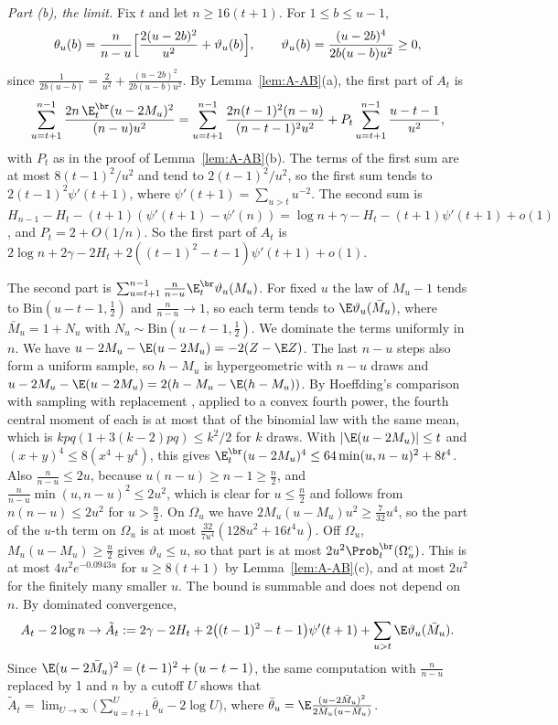 \emph{Part (b), the limit.} Fix $t$ and let $n\ge16(t+1)$. For
$1\le b\le u-1$,
\[
 \theta_u(b)=\frac n{n-u}\Bigl[\frac{2(u-2b)^2}{u^2}+\vartheta_u(b)\Bigr],
 \qquad \vartheta_u(b)=\frac{(u-2b)^4}{2b(u-b)u^2}\ge0,
\]
since $\frac1{2b(u-b)}=\frac2{u^2}+\frac{(u-2b)^2}{2b(u-b)u^2}$. By
Lemma~\ref{lem:A-AB}(a), the first part of $A_t$ is
\[
 \sum_{u=t+1}^{n-1}\frac{2n\,\E^{\br}_t(u-2M_u)^2}{(n-u)u^2}
 =\sum_{u=t+1}^{n-1}\frac{2n(t-1)^2(n-u)}{(n-t-1)^2u^2}
 +P_t\sum_{u=t+1}^{n-1}\frac{u-t-1}{u^2},
\]
with $P_t$ as in the proof of Lemma~\ref{lem:A-AB}(b). The terms of the
first sum are at most $8(t-1)^2/u^2$ and tend to $2(t-1)^2/u^2$, so the
first sum tends to $2(t-1)^2\psi'(t+1)$, where $\psi'(t+1)=\sum_{u>t}u^{-2}$.
The second sum is $H_{n-1}-H_t-(t+1)(\psi'(t+1)-\psi'(n))=\log n+\gamma-H_t-(t+1)\psi'(t+1)
+o(1)$, and $P_t=2+O(1/n)$. So the first part of
$A_t$ is $2\log n+2\gamma-2H_t+2((t-1)^2-t-1)\psi'(t+1)+o(1)$.

The second part is $\sum_{u=t+1}^{n-1}\frac n{n-u}\E^{\br}_t\vartheta_u(M_u)$.
For fixed $u$ the law of $M_u-1$ tends to $\mathrm{Bin}(u-t-1,\frac12)$ and
$\frac n{n-u}\to1$, so each term tends to $\E\vartheta_u(\bar M_u)$, where
$\bar M_u=1+N_u$ with $N_u\sim\mathrm{Bin}(u-t-1,\frac12)$. We dominate the
terms uniformly in $n$. We have $u-2M_u-\E(u-2M_u)=-2(Z-\E Z)$. The last
$n-u$ steps also form a uniform sample, so $h-M_u$ is hypergeometric with
$n-u$ draws and $u-2M_u-\E(u-2M_u)=2(h-M_u-\E(h-M_u))$. By Hoeffding's
comparison with sampling with replacement \cite[Theorem~4]{hoeffding1963},
applied to a convex fourth power, the fourth central moment of each is at
most that of the binomial law with the same mean, which is
$kpq(1+3(k-2)pq)\le k^2/2$ for $k$ draws. With $|\E(u-2M_u)|\le t$ and
$(x+y)^4\le8(x^4+y^4)$, this gives
$\E^{\br}_t(u-2M_u)^4\le64\min(u,n-u)^2+8t^4$. Also $\frac n{n-u}\le2u$,
because $u(n-u)\ge n-1\ge\frac n2$, and
$\frac n{n-u}\min(u,n-u)^2\le2u^2$, which is clear for $u\le\frac n2$ and
follows from $n(n-u)\le2u^2$ for $u>\frac n2$. On $\Omega_u$ we have
$2M_u(u-M_u)u^2\ge\frac7{32}u^4$, so the part of the $u$-th term on
$\Omega_u$ is at most $\frac{32}{7u^4}(128u^2+16t^4u)$. Off $\Omega_u$,
$M_u(u-M_u)\ge\frac u2$ gives $\vartheta_u\le u$, so that part is at most
$2u^2\Prob^{\br}_t(\Omega_u^c)$. This is at most $4u^2e^{-0.0943u}$ for
$u\ge8(t+1)$ by Lemma~\ref{lem:A-AB}(c), and at most $2u^2$ for the finitely
many smaller $u$. The bound is summable and does not depend on $n$. By
dominated convergence,
\[
 A_t-2\log n\to\tilde A_t:=2\gamma-2H_t+2\bigl((t-1)^2-t-1\bigr)\psi'(t+1)
 +\sum_{u>t}\E\vartheta_u(\bar M_u).
\]
Since $\E(u-2\bar M_u)^2=(t-1)^2+(u-t-1)$, the same computation with
$\frac n{n-u}$ replaced by 1 and $n$ by a cutoff $U$ shows that
$\tilde A_t=\lim_{U\to\infty}\bigl(\sum_{u=t+1}^U\bar\theta_u-2\log U\bigr)$,
where $\bar\theta_u=\E\frac{(u-2\bar M_u)^2}{2\bar M_u(u-\bar M_u)}$.

